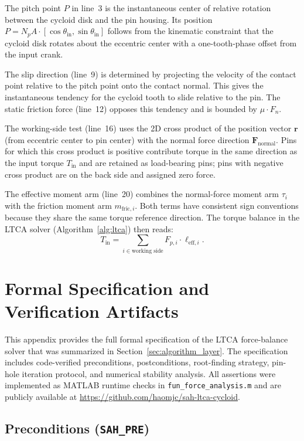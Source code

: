 \documentclass{article}
\begin{document}
The pitch point $P$ in line~3 is the instantaneous center of relative rotation between the cycloid disk and the pin housing. Its position $P = N_p A \cdot [\cos\theta_\text{in}, \sin\theta_\text{in}]$ follows from the kinematic constraint that the cycloid disk rotates about the eccentric center with a one-tooth-phase offset from the input crank.

The slip direction (line~9) is determined by projecting the velocity of the contact point relative to the pitch point onto the contact normal. This gives the instantaneous tendency for the cycloid tooth to slide relative to the pin. The static friction force (line~12) opposes this tendency and is bounded by $\mu \cdot F_n$.

The working-side test (line~16) uses the 2D cross product of the position vector $\mathbf{r}$ (from eccentric center to pin center) with the normal force direction $\mathbf{F}_\text{normal}$. Pins for which this cross product is positive contribute torque in the same direction as the input torque $T_\text{in}$ and are retained as load-bearing pins; pins with negative cross product are on the back side and assigned zero force.

The effective moment arm (line~20) combines the normal-force moment arm $\tau_i$ with the friction moment arm $m_{\text{fric},i}$. Both terms have consistent sign conventions because they share the same torque reference direction. The torque balance in the LTCA solver (Algorithm~\ref{alg:ltca}) then reads:
\begin{equation}
T_\text{in} = \sum_{i \in \text{working side}} F_{p,i} \cdot \ell_{\text{eff},i}.
\label{eqn:torque_balance}
\end{equation}

\section{Formal Specification and Verification Artifacts}
\label{sec:app_formal}

This appendix provides the full formal specification of the LTCA force-balance solver that was summarized in Section~\ref{sec:algorithm_layer}. The specification includes code-verified preconditions, postconditions, root-finding strategy, pin-hole iteration protocol, and numerical stability analysis. All assertions were implemented as MATLAB runtime checks in \texttt{fun\_force\_analysis.m} and are publicly available at \url{https://github.com/haomjc/sah-ltca-cycloid}.

\subsection{Preconditions (\texttt{SAH\_PRE})}
\end{document}
